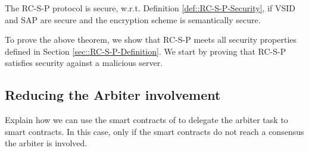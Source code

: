\begin{theorem}
The RC-S-P protocol is secure, w.r.t. Definition \ref{def::RC-S-P-Security}, if VSID and SAP are secure and the encryption scheme is semantically secure. 
\end{theorem}



 To prove the above theorem, we show that RC-S-P meets all security properties defined in Section \ref{sec::RC-S-P-Definition}.  We start by proving that RC-S-P satisfies security against a malicious server.  
 
 
 
 
\subsection{Reducing the Arbiter involvement}

{\color{blue}Explain how we can use the smart contracts of \cite{DongWAMM17} to delegate the arbiter task to smart contracts. In this case, only if the smart contracts do not reach a consensus the arbiter is involved. }





